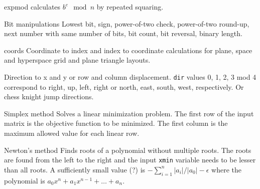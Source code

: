 \begin{algorithm}{expmod}
 calculates $b^e\mod n$ by repeated squaring.
\end{algorithm}

\begin{algorithm}{Bit manipulations}
\desc
Lowest bit, sign, power-of-two check, power-of-two round-up,
next number with same number of bits, bit count, bit reversal,
binary length.
\end{algorithm}

\begin{algorithm}{coords}
\desc
Coordinate to index and index to coordinate calculations for
plane, space and hyperspace grid and plane triangle layouts.

\desc
Direction to x and y or row and column displacement. {\tt dir} values
0, 1, 2, 3 mod 4 correspond to right, up, left, right or north, east, south,
west, respectively. Or chess knight jump directions.
\end{algorithm}

\begin{algorithm}{Simplex method}
\desc
Solves a linear minimization problem. The first row of the
input matrix is the objective function to be minimized. The
first column is the maximum allowed value for each linear row.
\end{algorithm}

\begin{algorithm}{Newton's method}
\desc
Finds roots of a polynomial without multiple roots. The roots are found from
the left to the right and the input {\tt xmin} variable needs to be lesser than
all roots. A sufficiently small value (?) is
$-\sum_{i=1}^n |a_i|/|a_0|-\epsilon$ where the polynomial is
$a_0 x^n + a_1 x^{n-1} + \dots + a_n$.
\end{algorithm}

